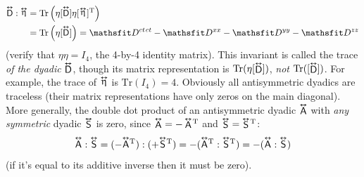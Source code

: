 \documentclass[12pt]{article}
\newcommand{\tightoverset}[2]{%
  \mathop{#2}\limits^{\vbox to -.5ex{\kern-0.75ex\hbox{$#1$}\vss}}}
\newcommand{\inlinedy}[1]{\tightoverset{\text{\tiny$\bm\leftrightarrow$}}{#1}}
\newcommand{\capdy}[1]{ \overset{ \text{\tiny$\bm\leftrightarrow$} }{\vphantom{\text{\small{A}}}\smash{#1}} }
\begin{document}
\begin{equation}\label{eq:dytrace}
\begin{split}
\capdy{\mathsf{D}} : \inlinedy{\upeta} &= \mathrm{Tr} \left( \eta [\capdy{\mathsf{D}}] \eta [ \mkern1mu \inlinedy{\upeta} \mkern.5mu ]^{\mathrm{T}} \right) \\
&= \mathrm{Tr} \left( \eta [\capdy{\mathsf{D}}] \right) = \mathsfit D^{ct \mkern1.5mu ct} - \mathsfit D^{xx} - \mathsfit D^{yy} - \mathsfit D^{zz}
\end{split}
\end{equation}
(verify that $\eta \eta = I_4$, the 4-by-4 identity matrix). This invariant is called the trace \emph{of the dyadic} $\inlinedy{\mathsf{D}}$, though its matrix representation is $\mathrm{Tr} (\eta [ \inlinedy{\mathsf{D}} ])$, \emph{not} $\mathrm{Tr} ( [ \inlinedy{\mathsf{D}} ] )$. For example, the trace of $\inlinedy{\upeta}$ is $\mathrm{Tr} (I_4) = 4$. Obviously all antisymmetric dyadics are traceless (their matrix representations have only zeros on the main diagonal). More generally, the double dot product of an antisymmetric dyadic $\inlinedy{\mathsf{A}}$ with \emph{any symmetric} dyadic $\inlinedy{\mathsf{S}}$ is zero, since $\inlinedy{\mathsf{A}} = - \inlinedy{\mathsf{A}} \mkern-2mu ^\mathrm{T}$ and $\inlinedy{\mathsf{S}} = \inlinedy{\mathsf{S}} \mkern-2mu^\mathrm{T}$:
\begin{equation*}
\capdy{\mathsf{A}} : \capdy{\mathsf{S}} = ( - \capdy{\mathsf{A}} \mkern0mu ^\mathrm{T} ) : ( + \capdy{\mathsf{S}} \mkern0mu ^\mathrm{T} ) = - ( \capdy{\mathsf{A}} \mkern0mu ^\mathrm{T} : \capdy{\mathsf{S}} \mkern0mu ^\mathrm{T} ) = - ( \capdy{\mathsf{A}} : \capdy{\mathsf{S}} )
\end{equation*}
(if it's equal to its additive inverse then it must be zero).
\end{document}
